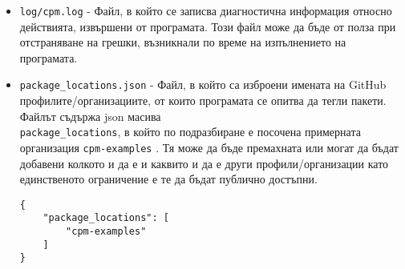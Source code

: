 \begin{itemize}
    \item \texttt{log/cpm.log} - Файл, в който се записва диагностична
          информация относно действията, извършени от програмата. Този файл може
          да бъде от полза при отстраняване на грешки, възникнали по време на
          изпълнението на програмата.
    \item \texttt{package\_locations.json} - Файл, в който са изброени имената
          на GitHub профилите/организациите, от които програмата се опитва да
          тегли пакети. Файлът съдържа \acrshort{json} масива \\
          \texttt{package\_locations}, в който по подразбиране е посочена
          примерната организация \texttt{cpm-examples}
          . Тя може да бъде премахната
          или могат да бъдат добавени колкото и да е и каквито и да е други
          профили/организации като единственото ограничение е те да бъдат
          публично достъпни.

\begin{lstlisting}[style=json,
                   caption=package\_locations.json по подразбиране,
                   label={lst:default-package-locations}]
{
    "package_locations": [
        "cpm-examples"
    ]
}
\end{lstlisting}
\end{itemize}
